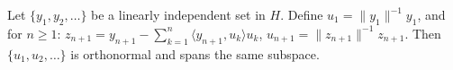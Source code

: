 Let $\{y_1, y_2, \ldots\}$ be a linearly independent set in $H$. Define $u_1 = \|y_1\|^{-1} y_1$, and for $n \geq 1$: $z_{n+1} = y_{n+1} - \sum_{k=1}^{n} \langle y_{n+1}, u_k \rangle u_k$, $u_{n+1} = \|z_{n+1}\|^{-1} z_{n+1}$. Then $\{u_1, u_2, \ldots\}$ is orthonormal and spans the same subspace.
